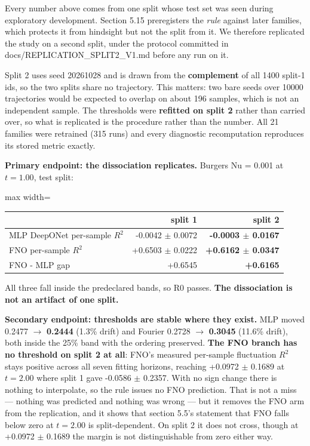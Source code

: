 \documentclass[preprint,12pt]{elsarticle}
\begin{document}
Every number above comes from one split whose test set was seen during exploratory development. Section 5.15 preregisters the \emph{rule} against later families, which protects it from hindsight but not the split from it. We therefore replicated the study on a second split, under the protocol committed in docs/REPLICATION\_SPLIT2\_V1.md before any run on it.

Split 2 uses seed 20261028 and is drawn from the \textbf{complement} of all 1400 split-1 ids, so the two splits share no trajectory. This matters: two bare seeds over 10000 trajectories would be expected to overlap on about 196 samples, which is not an independent sample. The thresholds were \textbf{refitted on split 2} rather than carried over, so what is replicated is the procedure rather than the number. All 21 families were retrained (315 runs) and every diagnostic recomputation reproduces its stored metric exactly.

\textbf{Primary endpoint: the dissociation replicates.} Burgers Nu = 0.001 at $t = 1.00$, test split:

\begin{center}
\begin{adjustbox}{max width=\linewidth}
\small
\begin{tabular}{lrr}
\toprule
 & split 1 & split 2 \\
\midrule
MLP DeepONet per-sample $R^2$ & -0.0042 $\pm$ 0.0072 & \textbf{-0.0003 $\pm$ 0.0167} \\
FNO per-sample $R^2$ & +0.6503 $\pm$ 0.0222 & \textbf{+0.6162 $\pm$ 0.0347} \\
FNO - MLP gap & +0.6545 & \textbf{+0.6165} \\
\bottomrule
\end{tabular}
\end{adjustbox}
\end{center}


All three fall inside the predeclared bands, so R0 passes. \textbf{The dissociation is not an artifact of one split.}

\textbf{Secondary endpoint: thresholds are stable where they exist.} MLP moved 0.2477 $\to$ \textbf{0.2444} (1.3\% drift) and Fourier 0.2728 $\to$ \textbf{0.3045} (11.6\% drift), both inside the 25\% band with the ordering preserved. \textbf{The FNO branch has no threshold on split 2 at all}: FNO's measured per-sample fluctuation $R^2$ stays positive across all seven fitting horizons, reaching +0.0972 $\pm$ 0.1689 at $t = 2.00$ where split 1 gave -0.0586 $\pm$ 0.2357. With no sign change there is nothing to interpolate, so the rule issues no FNO prediction. That is not a miss --- nothing was predicted and nothing was wrong --- but it removes the FNO arm from the replication, and it shows that section 5.5's statement that FNO falls below zero at $t = 2.00$ is split-dependent. On split 2 it does not cross, though at +0.0972 $\pm$ 0.1689 the margin is not distinguishable from zero either way.
\end{document}
